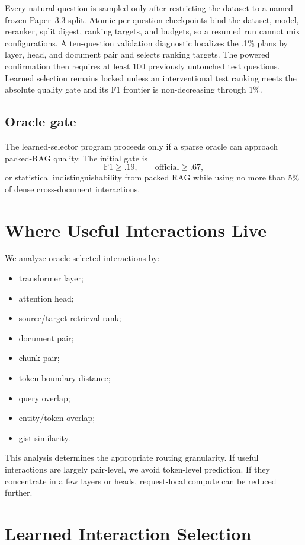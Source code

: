 \documentclass[11pt]{article}
\begin{document}
Every natural question is sampled only after restricting the dataset to a
named frozen Paper~3.3 split. Atomic per-question checkpoints bind the dataset,
model, reranker, split digest, ranking targets, and budgets, so a resumed run
cannot mix configurations. A ten-question validation diagnostic localizes the
.1\% plans by layer, head, and document pair and selects ranking targets. The
powered confirmation then requires at least 100 previously untouched test
questions. Learned selection remains locked unless an interventional test
ranking meets the absolute quality gate and its F1 frontier is non-decreasing
through 1\%.

\subsection{Oracle gate}

The learned-selector program proceeds only if a sparse oracle can approach
packed-RAG quality. The initial gate is
\[
\mathrm{F1}\ge .19,
\qquad
\mathrm{official}\ge .67,
\]
or statistical indistinguishability from packed RAG while using no more than
5\% of dense cross-document interactions.

\section{Where Useful Interactions Live}

We analyze oracle-selected interactions by:
\begin{itemize}[leftmargin=*]
    \item transformer layer;
    \item attention head;
    \item source/target retrieval rank;
    \item document pair;
    \item chunk pair;
    \item token boundary distance;
    \item query overlap;
    \item entity/token overlap;
    \item gist similarity.
\end{itemize}

This analysis determines the appropriate routing granularity. If useful
interactions are largely pair-level, we avoid token-level prediction. If they
concentrate in a few layers or heads, request-local compute can be reduced
further.

\section{Learned Interaction Selection}
\end{document}
